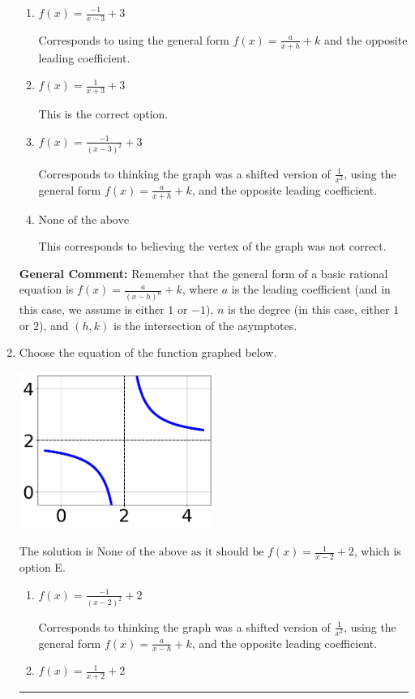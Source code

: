 \documentclass{extbook}[14pt]
\newcommand{\litem}[1]{\item #1

\rule{\textwidth}{0.4pt}}
\begin{document}
\begin{enumerate}
{\begin{enumerate}[label=\Alph*.]
Corresponds to thinking the graph was a shifted version of $\frac{1}{x^2}$.
\item \( f(x) = \frac{-1}{x - 3} + 3 \)

Corresponds to using the general form $f(x) = \frac{a}{x+h}+k$ and the opposite leading coefficient.
\item \( f(x) = \frac{1}{x + 3} + 3 \)

This is the correct option.
\item \( f(x) = \frac{-1}{(x - 3)^2} + 3 \)

Corresponds to thinking the graph was a shifted version of $\frac{1}{x^2}$, using the general form $f(x) = \frac{a}{x+h}+k$, and the opposite leading coefficient.
\item \( \text{None of the above} \)

This corresponds to believing the vertex of the graph was not correct.
\end{enumerate}

\textbf{General Comment:} Remember that the general form of a basic rational equation is $ f(x) = \frac{a}{(x-h)^n} + k$, where $a$ is the leading coefficient (and in this case, we assume is either $1$ or $-1$), $n$ is the degree (in this case, either $1$ or $2$), and $(h, k)$ is the intersection of the asymptotes.
}
\litem{
Choose the equation of the function graphed below.

\begin{center}
    \includegraphics[width=0.5\textwidth]{../Figures/rationalGraphToEquationCopyB.png}
\end{center}


The solution is \( \text{None of the above as it should be } f(x) = \frac{1}{x - 2} + 2 \), which is option E.\begin{enumerate}[label=\Alph*.]
\item \( f(x) = \frac{-1}{(x - 2)^2} + 2 \)

Corresponds to thinking the graph was a shifted version of $\frac{1}{x^2}$, using the general form $f(x) = \frac{a}{x-h}+k$, and the opposite leading coefficient.
\item \( f(x) = \frac{1}{x + 2} + 2 \)


\end{enumerate}}
\end{enumerate}
\end{document}
